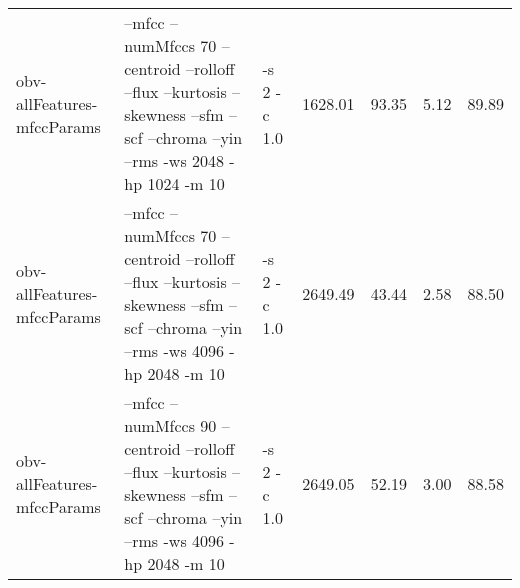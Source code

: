 \documentclass[11pt,a4paper]{article}
\begin{document}
\begin{tabular}{lllrrrr}
 obv-allFeatures-mfccParams  &  --mfcc --numMfccs 70 --centroid --rolloff --flux --kurtosis --skewness --sfm --scf --chroma --yin --rms -ws 2048 -hp 1024 -m 10   &  -s 2 -c 1.0  &  1628.01  &   93.35  &  5.12  &  89.89  \\
 obv-allFeatures-mfccParams  &  --mfcc --numMfccs 70 --centroid --rolloff --flux --kurtosis --skewness --sfm --scf --chroma --yin --rms -ws 4096 -hp 2048 -m 10   &  -s 2 -c 1.0  &  2649.49  &   43.44  &  2.58  &  88.50  \\
 obv-allFeatures-mfccParams  &  --mfcc --numMfccs 90 --centroid --rolloff --flux --kurtosis --skewness --sfm --scf --chroma --yin --rms -ws 4096 -hp 2048 -m 10   &  -s 2 -c 1.0  &  2649.05  &   52.19  &  3.00  &  88.58  \\
\end{tabular}
\end{document}
